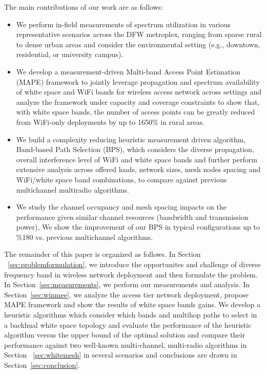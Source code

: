 The main contributions of our work are as follows:
\begin{itemize}
\item We perform in-field measurements of spectrum utilization in various representative
scenarios across the DFW metroplex, ranging from sparse rural to dense urban areas and 
consider the environmental setting (e.g., downtown, residential, or university campus).
\item We develop a measurement-driven Multi-band Access Point Estimation (MAPE) framework 
to jointly leverage propagation and spectrum availability of white space and WiFi bands 
for wireless access network across settings and analyze the framework under capacity and 
coverage constraints to show that, with white space bands, the number of access points 
can be greatly reduced from WiFi-only deployments by up to 1650\% in rural areas. 
\item We build a complexity reducing heuristic measurement driven algorithm, Band-based 
Path Selection (BPS), which considers the diverse propagation, overall interference level 
of WiFi and white space bands and further perform extensive analysis across offered loads,
network sizes, mesh nodes spacing and WiFi/white space band combinations, to compare against previous 
multichannel multiradio algorithms. 
%
%
\item We study the channel occupancy and mesh spacing impacts on the performance given similar 
channel resources (bandwidth and transmission power), We show the improvement of our BPS in typical
configurations up to \%180 vs. previous multichannel algorithms.
\end{itemize}

The remainder of this paper is organized as follows. In Section
~\ref{sec:problemformulation}, we introduce the opportunites and challenge of diverse 
frequency band in wireless network deployment and then formulate the problem. 
In Section~\ref{sec:measurements}, we perform our measurements and analysis. 
In Section~\ref{sec:winmee}, we analyze the access tier network deployment, 
propose MAPE framework and show the results of white space bands gains. We 
develop a heuristic algorithms which consider which bands and multihop paths 
to select in a backhual white space topology and evaluate the performance of 
the heuristic algorithm versus the upper bound of the optimal solution and 
compare their performance against two well-known multi-channel, multi-radio 
algorithms in Section ~\ref{sec:whitemesh} in several scenarios and conclusions 
are drawn in Section~\ref{sec:conclusion}.



